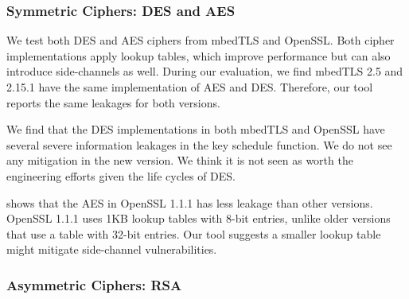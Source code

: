\subsubsection{Symmetric Ciphers: DES and AES}\label{eval:sym}
We test both DES and AES ciphers from mbedTLS and OpenSSL\@. Both cipher
implementations apply lookup tables, which improve performance but can also introduce side-channels as well. During our evaluation, we find mbedTLS 2.5 and 2.15.1 have the same implementation of AES and DES\@. Therefore, our tool reports the same leakages for both versions. 

We find that the DES implementations in both mbedTLS and OpenSSL have several
severe information leakages in the key schedule function.
We do not see any mitigation
in the new version. We think it is not seen as worth the engineering
efforts given the life cycles of DES\@.

\tool{} shows that the AES in OpenSSL 1.1.1 has less leakage than other versions. 
OpenSSL 1.1.1 uses 1KB lookup tables with 8-bit entries, unlike older versions that use a table with 32-bit entries. Our tool suggests a smaller lookup table might mitigate side-channel vulnerabilities. 



\subsubsection{Asymmetric Ciphers: RSA}\label{eval:asym}

